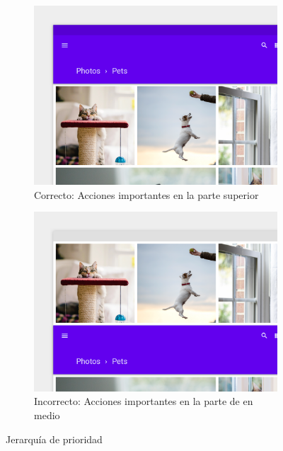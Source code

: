 \begin{figure}[hbt]
	\centering
	\begin{subfigure}[b]{0.4\linewidth}
		\centering
        \includegraphics[width=1\linewidth]{figs/Desarrollo/Accesibilidad/gatosyperrosbien}
        \caption[Acciones importantes en la parte superior]{Correcto: Acciones importantes en la parte superior}
	\end{subfigure} 
	\begin{subfigure}[b]{0.4\linewidth}
		\centering
        \includegraphics[width=1\linewidth]{figs/Desarrollo/Accesibilidad/gatosyperrosmal}
        \caption[Acciones importantes en la parte de en medio]{Incorrecto: Acciones importantes en la parte de en medio}
	\end{subfigure} 
	\caption[Jerarquía de prioridad]{Jerarquía de prioridad}
	\label{fig:gatosyperros}
\end{figure}

